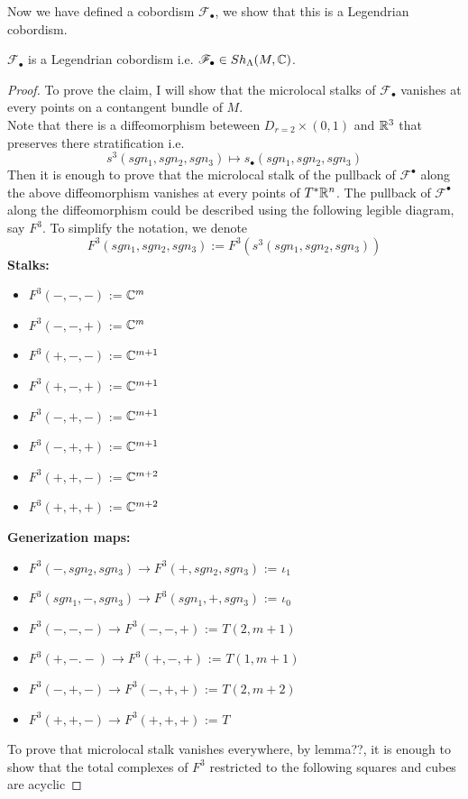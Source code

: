 Now we have defined a cobordism $\mathscr{F}_\bullet$, we show that this is a Legendrian cobordism.
\begin{proposition}
$\mathscr{F}_\bullet$ is a Legendrian cobordism i.e. $\mathscr{F}_\bullet \in Sh_\Lambda(M,\mathbb{C})$.
\end{proposition}
\begin{proof}
To prove the claim, I will show that the microlocal stalks of $\mathscr{F}_\bullet$ vanishes at every points on a contangent bundle of $M$.\\
Note that there is a diffeomorphism beteween $D_{r=2} \times (0,1)$ and $\mathbb{R}^3$ that preserves there stratification i.e.
\[
s^3(sgn_1,sgn_2,sgn_3) \mapsto s_\bullet(sgn_1,sgn_2,sgn_3)
\]
Then it is enough to prove that the microlocal stalk of the pullback of $\mathscr{F}^\bullet$ along the above diffeomorphism vanishes at every points of $T^*\mathbb{R}^n$. The pullback of $\mathscr{F}^\bullet$ along the diffeomorphism could be described using the following legible diagram, say $F^3$. To simplify the notation, we denote
\[
F^3(sgn_1,sgn_2,sgn_3):= F^3(s^3(sgn_1,sgn_2,sgn_3))
\]
\textbf{Stalks:}
\begin{itemize}
\item $F^3(-,-,-)$ := $\mathbb{C}^m$
\item $F^3(-,-,+)$ := $\mathbb{C}^m$
\item $F^3(+,-,-)$ := $\mathbb{C}^{m+1}$
\item $F^3(+,-,+)$ := $\mathbb{C}^{m+1}$
\item $F^3(-,+,-)$ := $\mathbb{C}^{m+1}$
\item $F^3(-,+,+)$ := $\mathbb{C}^{m+1}$
\item $F^3(+,+,-)$ := $\mathbb{C}^{m+2}$
\item $F^3(+,+,+)$ := $\mathbb{C}^{m+2}$
\end{itemize}

\textbf{Generization maps:}
\begin{itemize}
\item $F^3(-,sgn_2,sgn_3)\rightarrow F^3(+,sgn_2,sgn_3)$ := $\iota_1$
\item $F^3(sgn_1,-,sgn_3)\rightarrow F^3(sgn_1,+,sgn_3)$ := $\iota_0$
\item $F^3(-,-,-)\rightarrow F^3(-,-,+)$ := $T(2,m+1)$
\item $F^3(+,-.-)\rightarrow F^3(+,-,+)$ := $T(1,m+1)$
\item $F^3(-,+,-)\rightarrow F^3(-,+,+)$ := $T(2,m+2)$
\item $F^3(+,+,-)\rightarrow F^3(+,+,+)$ := $T$
\end{itemize}
To prove that microlocal stalk vanishes everywhere, by lemma??, it is enough to show that the total complexes of $F^3$ restricted to the following squares and cubes are acyclic


\end{proof}

